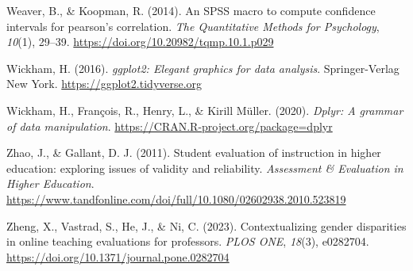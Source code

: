 \documentclass[
  man]{apa7}
\newlength{\cslhangindent}
\newlength{\cslentryspacingunit} %
\newenvironment{CSLReferences}[2] %
 {%
  \setlength{\parindent}{0pt}
  \ifodd #1
  \let\oldpar\par
  \def\par{\hangindent=\cslhangindent\oldpar}
  \fi
  \setlength{\parskip}{#2\cslentryspacingunit}
 }%
 {}
\begin{document}
\begin{CSLReferences}{1}{0}
\leavevmode{}%
Weaver, B., \& Koopman, R. (2014). An SPSS macro to compute confidence intervals for pearson{'}s correlation. \emph{The Quantitative Methods for Psychology}, \emph{10}(1), 29--39. \url{https://doi.org/10.20982/tqmp.10.1.p029}

\leavevmode{}%
Wickham, H. (2016). \emph{ggplot2: Elegant graphics for data analysis}. Springer-Verlag New York. \url{https://ggplot2.tidyverse.org}

\leavevmode{}%
Wickham, H., François, R., Henry, L., \& Kirill Müller. (2020). \emph{Dplyr: A grammar of data manipulation}. \url{https://CRAN.R-project.org/package=dplyr}

\leavevmode{}%
Zhao, J., \& Gallant, D. J. (2011). Student evaluation of instruction in higher education: exploring issues of validity and reliability. \emph{Assessment \& Evaluation in Higher Education}. \url{https://www.tandfonline.com/doi/full/10.1080/02602938.2010.523819}

\leavevmode{}%
Zheng, X., Vastrad, S., He, J., \& Ni, C. (2023). Contextualizing gender disparities in online teaching evaluations for professors. \emph{PLOS ONE}, \emph{18}(3), e0282704. \url{https://doi.org/10.1371/journal.pone.0282704}

\end{CSLReferences}
\end{document}
